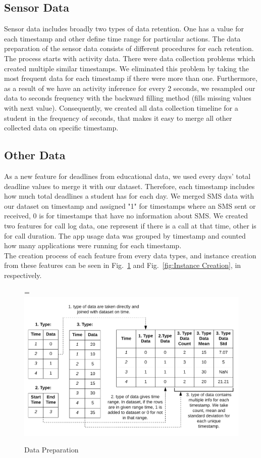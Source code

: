 \documentclass[12pt,oneandhalf,chaparabic,lfm,phd,eng,oneside,pntc]{gsufbe}
\makeatletter
\let\old@includegraphics\includegraphics
\renewcommand{\includegraphics}[2][,]{%
  \setbox9=\hbox{\old@includegraphics[#1]{#2}}%
  \ifdim\wd9>\textwidth
    \old@includegraphics[#1,width=\textwidth]{#2}%
  \else
    \old@includegraphics[#1]{#2}%
  \fi%
}
\makeatother
\begin{document}
\subsection{Sensor Data}
\label{subsec:SensorPrep}
Sensor data includes broadly two types of data retention. One has a value for each timestamp and other define time range for particular actions. The data preparation of the sensor data consists of different procedures for each retention. The process starts with activity data. There were data collection problems which created multiple similar timestamps. We eliminated this problem by taking the most frequent data for each timestamp if there were more than one. Furthermore, as a result of we have an activity inference for every 2 seconds, we resampled our data to seconds frequency with the backward filling method (fills missing values with next value). Consequently, we created all data collection timeline for a student in the frequency of seconds, that makes it easy to merge all other collected data on specific timestamp. 

\subsection{Other Data}
\label{subsec:OtherPrep}
As a new feature for deadlines from educational data, we used every days’ total deadline values to merge it with our dataset. Therefore, each timestamp includes how much total deadlines a student has for each day. We merged SMS data with our dataset on timestamp and assigned "1" for timestamps where an SMS sent or received, 0 is for timestamps that have no information about SMS. We created two features for call log data, one represent if there is a call at that time, other is for call duration. The app usage data was grouped by timestamp and counted how many applications were running for each timestamp. \\
The creation process of each feature from every data types, and instance creation from these features can be seen in Fig.~\ref{fig:Data Prep} and Fig.~\ref{fig:Instance Creation}, in respectively.


\begin{figure}[t]\vspace*{4pt}
\centerline{\includegraphics[width=160mm]{graphics/Dataset_Preparation.png}}
\caption{Data Preparation}
\label{fig:Data Prep}
\end{figure}
\end{document}
